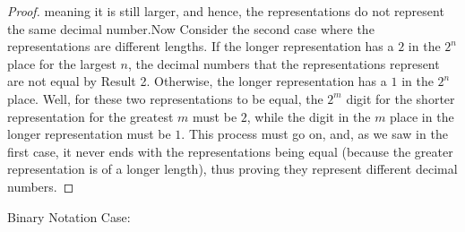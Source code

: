 \documentclass{article}
\theoremstyle{definition}
\begin{document}
\begin{proof}
meaning it is still larger, and hence, the representations do not represent the same decimal number.\newline Now Consider the second case where the
representations are different lengths. If the longer representation has a $2$ in the $2^n$ place for the largest $n$, the decimal numbers that the
representations represent are not equal by Result 2. Otherwise, the longer representation has a $1$ in the $2^n$ place. Well, for these two representations
to be equal, the $2^m$ digit for the shorter representation for the greatest $m$ must be $2$, while the digit in the $m$ place in the longer representation
must be $1$. This process must go on, and, as we saw in the first case, it never ends with the representations being equal (because the greater
representation is of a longer length), thus proving they represent different decimal numbers.
\end{proof} 
Binary Notation Case:\newline
\end{document}
